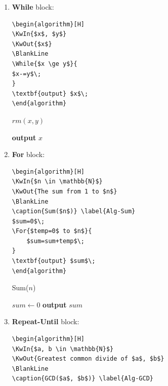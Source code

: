 \documentclass[12pt,a4paper]{article}
\theoremstyle{definition}
\begin{document}
\begin{enumerate}
\item {\color{blue}\textbf{While} block:}

\begin{minipage}[t]{0.5\textwidth}
\begin{verbatim}
\begin{algorithm}[H]
\KwIn{$x$, $y$}
\KwOut{$x$}
\BlankLine
\While{$x \ge y$}{
$x-=y$\;
}
\textbf{output} $x$\;
\end{algorithm}
\end{verbatim}
\end{minipage}
\hspace{2mm}
\begin{minipage}[t]{0.4\textwidth}
\begin{algorithm}[H]
\BlankLine
\caption{$rm(x,y)$} \label{Alg-rm}
\textbf{output} $x$\;
\end{algorithm}
\end{minipage}

\item {\color{blue}\textbf{For} block:}

\begin{minipage}[t]{0.5\textwidth}
\begin{verbatim}
\begin{algorithm}[H]
\KwIn{$n \in \mathbb{N}$}
\KwOut{The sum from 1 to $n$}
\BlankLine
\caption{Sum($n$)} \label{Alg-Sum}
$sum=0$\;
\For{$temp=0$ to $n$}{
    $sum=sum+temp$\;
}
\textbf{output} $sum$\;
\end{algorithm}
\end{verbatim}
\end{minipage}
\hspace{2mm}
\begin{minipage}[t]{0.4\textwidth}
\begin{algorithm}[H]
\BlankLine
\caption{Sum($n$)} \label{Alg-Sum}
$sum \leftarrow 0$\;
\textbf{output} $sum$\;
\end{algorithm}
\end{minipage}

\newpage
\item {\color{blue}\textbf{Repeat-Until} block:}

\begin{minipage}[t]{0.5\textwidth}
\begin{verbatim}
\begin{algorithm}[H]
\KwIn{$a, b \in \mathbb{N}$}
\KwOut{Greatest common divide of $a$, $b$}
\BlankLine
\caption{GCD($a$, $b$)} \label{Alg-GCD}


\end{verbatim}
\end{minipage}
\end{enumerate}
\end{document}
